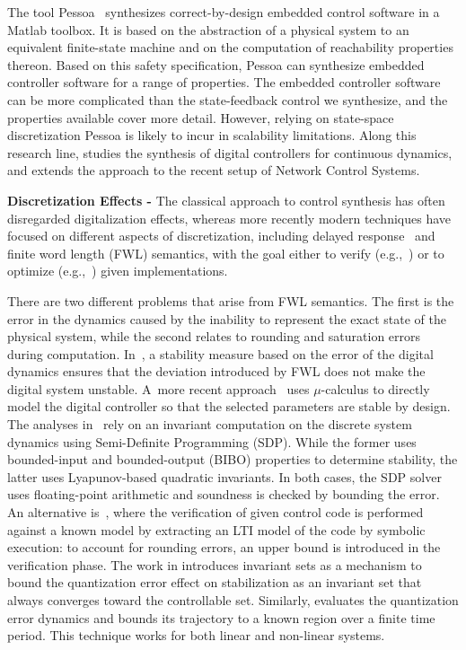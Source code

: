 \documentclass[twocolumn]{autart}    %
\begin{document}
The tool Pessoa~\cite{mazo2010pessoa} synthesizes correct-by-design embedded
control software in a Matlab toolbox.  It is based on the abstraction of a
physical system to an equivalent finite-state machine and on the computation
of reachability properties thereon. 
Based on this safety specification, \mbox{Pessoa} can synthesize embedded controller
software for a range of properties.  The embedded controller software can be
more complicated than the state-feedback control we synthesize, and the
properties available cover more detail. 
However, relying on state-space discretization \mbox{Pessoa} is likely to incur in scalability limitations. 
Along this research line, \cite{Anta2010,liu16} studies the synthesis of digital controllers for continuous dynamics, 
and \cite{zamani2014} extends the approach to the recent setup of Network Control Systems. 

\textbf{Discretization Effects -}
The classical approach to control synthesis has often disregarded digitalization effects, 
whereas more recently modern techniques have focused on
different aspects of discretization, including delayed
response~\cite{Duggirala2015} and finite word length (FWL) semantics, 
with the goal either to verify (e.g.,~\cite{daes20161}) or to optimize
(e.g.,~\cite{oudjida2014design}) given implementations. 

There are two different problems that arise from FWL semantics.  The first
is the error in the dynamics caused by the inability to represent the exact
state of the physical system, while the second relates to rounding and saturation errors
during computation.  In~\cite{fialho1994stability}, a stability measure
based on the error of the digital dynamics ensures that the deviation
introduced by FWL does not make the digital system unstable.  A~more recent
approach~\cite{DBLP:journals/automatica/WuLCC09} uses $\mu$-calculus to
directly model the digital controller so that the selected parameters are
stable by design.  The analyses in~\cite{DBLP:conf/hybrid/RouxJG15,
DBLP:conf/hybrid/WangGRJF16} rely on an invariant computation on the
discrete system dynamics using Semi-Definite Programming (SDP).  While the
former uses bounded-input and bounded-output (BIBO) properties to determine
stability, the latter uses Lyapunov-based quadratic invariants.  In both
cases, the SDP solver uses floating-point arithmetic and soundness is
checked by bounding the error.  An alternative is~\cite{park2016scalable},
where the verification of given control code is performed against a known
model by extracting an LTI model of the code by symbolic execution:  
to account for rounding errors, an upper bound is introduced in the
verification phase.  The work in \cite{picasso2003stabilization}
introduces invariant sets as a mechanism
to bound the quantization error effect on stabilization as an invariant set
that always converges toward the controllable set.  Similarly,
\cite{liberzon2003hybrid} evaluates the quantization error dynamics
and bounds its trajectory to a known region over a finite time period. 
This technique works for both linear and non-linear systems.
\end{document}
